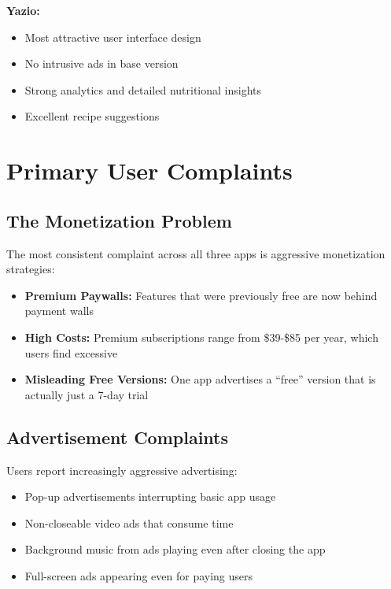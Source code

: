 \documentclass[12pt, a4paper]{article}
\begin{document}
\textbf{Yazio:}
\begin{itemize}
    \item Most attractive user interface design
    \item No intrusive ads in base version
    \item Strong analytics and detailed nutritional insights
    \item Excellent recipe suggestions
\end{itemize}

\vspace{0.5cm}

\section{Primary User Complaints}

\subsection{The Monetization Problem}

The most consistent complaint across all three apps is aggressive monetization strategies:

\begin{itemize}
    \item \textbf{Premium Paywalls:} Features that were previously free are now behind payment walls
    \item \textbf{High Costs:} Premium subscriptions range from \$39-\$85 per year, which users find excessive
    \item \textbf{Misleading Free Versions:} One app advertises a ``free'' version that is actually just a 7-day trial
\end{itemize}

\subsection{Advertisement Complaints}

Users report increasingly aggressive advertising:

\begin{itemize}
    \item Pop-up advertisements interrupting basic app usage
    \item Non-closeable video ads that consume time
    \item Background music from ads playing even after closing the app
    \item Full-screen ads appearing even for paying users
\end{itemize}
\end{document}
